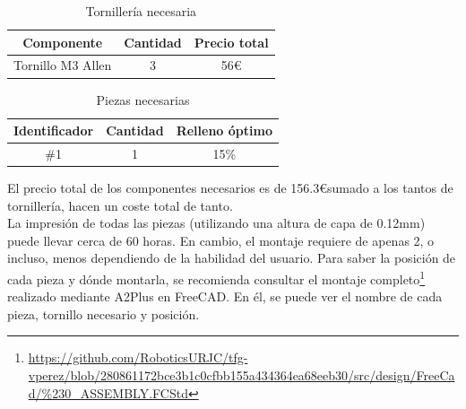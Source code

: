 \begin{table}[H]
\begin{center}
\begin{tabular}{|c|c|c|}
\hline
\textbf{Componente} & \textbf{Cantidad} & \textbf{Precio total} \\
\hline
Tornillo M3 Allen & 3 & 56\euro \\

\hline
\end{tabular}
\caption{Tornillería necesaria}
\label{cuadro:tornilleria}
\end{center}
\end{table}


\begin{table}[H]
\begin{center}
\begin{tabular}{|c|c|c|}
\hline
\textbf{Identificador} & \textbf{Cantidad} & \textbf{Relleno óptimo} \\
\hline
\#1 & 1 & 15\% \\
\hline
\end{tabular}
\caption{Piezas necesarias}
\label{cuadro:piezas}
\end{center}
\end{table}

El precio total de los componentes necesarios es de 156.3\euro sumado a los tantos de tornillería, hacen un coste total de tanto.\\

La impresión de todas las piezas (utilizando una altura de capa de 0.12mm) puede llevar cerca de 60 horas. En cambio, 
el montaje requiere de apenas 2, o incluso, menos dependiendo de la habilidad del usuario. Para saber la posición de cada pieza 
y dónde montarla, se recomienda consultar el montaje 
completo\footnote{\url{https://github.com/RoboticsURJC/tfg-vperez/blob/280861172bce3b1c0cfbb155a434364ea68eeb30/src/design/FreeCad/\%230\_ASSEMBLY.FCStd}} 
realizado mediante A2Plus en FreeCAD. En él, se puede ver 
el nombre de cada pieza, tornillo necesario y posición.
